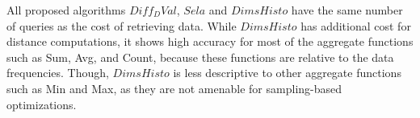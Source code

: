 All proposed algorithms $Diff_DVal$, $Sela$ and $DimsHisto$ have the same 
number of queries as the cost of retrieving data.
%
While $DimsHisto$ has additional cost for distance computations, it shows high accuracy for most of the aggregate functions such as Sum, Avg, and Count, because these functions are relative to the data frequencies. 
%
Though, $DimsHisto$ is less descriptive to other aggregate functions such as Min and Max, as they are not amenable for sampling-based optimizations.
%